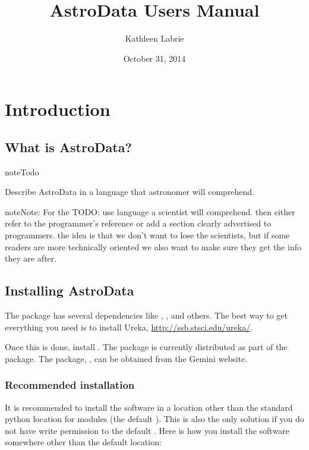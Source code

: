 \documentclass[letterpaper,10pt,english]{sphinxmanual}
\title{AstroData Users Manual}
\date{October 31, 2014}
\author{Kathleen Labrie}
\begin{document}
\maketitle
\tableofcontents
{}\label{index-latex::doc}



\chapter{Introduction}
\label{intro:introduction}\label{intro:intro}\label{intro::doc}\label{intro:astrodata-user-s-manual}

\section{What is AstroData?}
\label{intro:what-is-astrodata}
\begin{notice}{note}{Todo}

Describe AstroData in a language that astronomer will comprehend.
\end{notice}

\begin{notice}{note}{Note:}
For the TODO: use language a scientist will comprehend.  then either refer to the programmer's reference
or add a section clearly advertised to programmers.  the idea is that we don't want to lose
the scientists, but if some readers are more technically oriented we also want to make sure
they get the info they are after.
\end{notice}


\section{Installing AstroData}
\label{intro:installing-astrodata}\label{intro:install}
The  package has several dependencies like , , and others.
The best way to get everything you need is to install Ureka, \href{http://ssb.stsci.edu/ureka/}{http://ssb.stsci.edu/ureka/}.

Once this is done, install .  The  package is currently
distributed as part of the  package.  The  package,
, can be obtained from the Gemini website.


\subsection{Recommended installation}
\label{intro:recommended-installation}
It is recommended to install the software in a location other than the standard python
location for modules (the default ). This is also the only solution if
you do not have write permission to the default .  Here is how you
install the software somewhere other than the default location:
\end{document}
